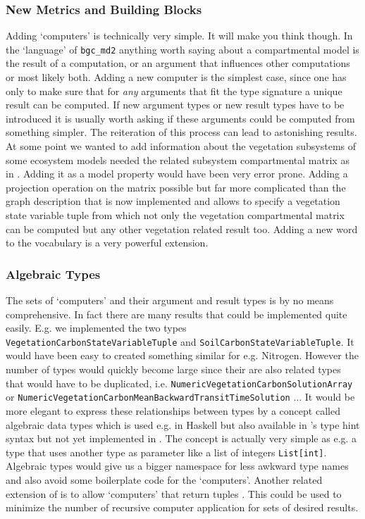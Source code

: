 \subsubsection{New Metrics and Building Blocks}
Adding `computers' is technically very simple. It will make you think though.
In the `language' of \texttt{bgc\_md2} anything worth saying about a compartmental model is the result of a computation, or an argument that influences other computations or most likely both.
Adding a new computer is the simplest case, since one has only to make sure that for \emph{any} arguments that fit the type signature a unique result can be computed. If new argument types or new result types have to be introduced it is usually worth asking if these arguments could be computed from something simpler. The reiteration of this process can lead to astonishing results.
At some point we wanted to add information about the vegetation subsystems of some ecosystem models needed the related subsystem compartmental matrix as in \citep{Ceballos2018Biogeosciences}. Adding it as a model property would have been very error prone.
Adding a projection operation on the matrix possible but far more complicated
than the graph description that is now implemented and allows to specify a
vegetation state variable tuple from which not only the vegetation
compartmental matrix can be computed but any other vegetation related result too. 
Adding a new word to the vocabulary is a very powerful extension.

\subsubsection{Algebraic Types}
The sets of `computers' and their argument and result types is by no means comprehensive.
In fact there are many results that could be implemented quite easily. 
E.g. we implemented the two types \texttt{VegetationCarbonStateVariableTuple} and 
\texttt{SoilCarbonStateVariableTuple}. It would have been easy to created something similar for e.g. Nitrogen. However the number of types would quickly become large since their
are also related types that would have to be duplicated, i.e. \texttt{NumericVegetationCarbonSolutionArray} or \texttt{NumericVegetationCarbonMeanBackwardTransitTimeSolution} ...
It would be more elegant to express these relationships between types by a concept called
algebraic data types which is used e.g. in  Haskell but also available in \python 's type hint syntax but not yet implemented in \ComputabilityGraphs.
The concept is actually very simple as e.g. a type that uses another type as parameter like a list of integers \texttt{List[int]}. Algebraic types would give us a bigger namespace for less awkward type names and also avoid some boilerplate code for the `computers'.
Another related extension of \ComputabilityGraphs is to allow `computers' that return tuples . 
This could be used to minimize the number of recursive computer application for sets of desired results.   

